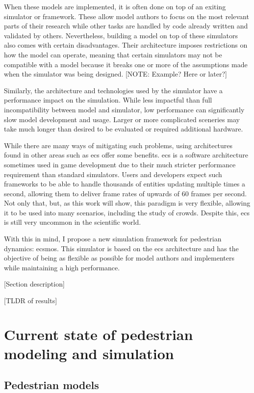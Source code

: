 \documentclass[twoside, 11pt]{article}
\begin{document}
When these models are implemented, it is often done on top of an exiting simulator or framework. These allow model authors to focus on the most relevant parts of their research while other tasks are handled by code already written and validated by others. Nevertheless, building a model on top of these simulators also comes with certain disadvantages. Their architecture imposes restrictions on how the model can operate, meaning that certain simulators may not be compatible with a model because it breaks one or more of the assumptions made when the simulator was being designed. [NOTE: Example? Here or later?]

Similarly, the architecture and technologies used by the simulator have a performance impact on the simulation. While less impactful than full incompatibility between model and simulator, low performance can significantly slow model development and usage. Larger or more complicated sceneries may take much longer than desired to be evaluated or required additional hardware.

While there are many ways of mitigating such problems, using architectures found in other areas such as \gls{ecs} offer some benefits. \gls{ecs} is a software architecture sometimes used in game development due to their much stricter performance requirement than standard simulators. Users and developers expect such frameworks to be able to handle thousands of entities updating multiple times a second, allowing them to deliver frame rates of upwards of 60 frames per second. Not only that, but, as this work will show, this paradigm is very flexible, allowing it to be used into many scenarios, including the study of crowds. Despite this, \gls{ecs} is still very uncommon in the scientific world.

With this in mind, I propose a new simulation framework for pedestrian dynamics: \gls{ecsmos}. This simulator is based on the \gls{ecs} architecture and has the objective of being as flexible as possible for model authors and implementers while maintaining a high performance.

[Section description]

[TLDR of results]

\section{Current state of pedestrian modeling and simulation} \label{overview}

\subsection{Pedestrian models}
\end{document}
